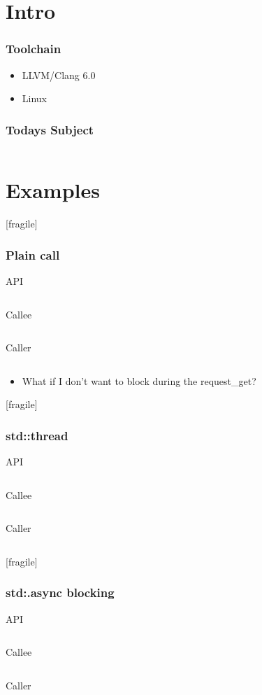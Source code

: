 
\section{Intro}


\begin{frame}[fragile]
	\frametitle{Toolchain}
	\begin{itemize}
		\item LLVM/Clang 6.0
		\item Linux
	\end{itemize}
\end{frame}

\newcommand{\code}[4]{\inputminted[fontsize=\scriptsize,firstline=#1,lastline=#2,xleftmargin=#3]{cpp}{../mixed/src/#4}}

\begin{frame}[fragile]
	\frametitle{Todays Subject}
	\code{12}{16}{10pt}{sync/http_client.h}
\end{frame}


\section{Examples}

\newcommand{\simpleexample}[7]{%
	API
	\code{#6}{#7}{0pt}{#5/http_client.h}
	\vspace{1mm}
	Callee
	\code{#1}{#2}{0pt}{presentation_examples_test.h}
	\vspace{1mm}
	Caller
	\code{#3}{#4}{-16pt}{presentation_examples_test.cpp}
}

\begin{frame}{[fragile]}
	\frametitle{Plain call}
	\simpleexample{22}{26}{15}{16}{sync}{12}{16}
	\begin{itemize}
		\item What if I don't want to block during the request\_get?
	\end{itemize}
\end{frame}%

\begin{frame}{[fragile]}
	\frametitle{std::thread}
	\simpleexample{30}{39}{22}{23}{threaded}{12}{16}
\end{frame}%

\begin{frame}{[fragile]}
	\frametitle{std:.async blocking}
	\simpleexample{41}{49}{29}{30}{threaded}{12}{16}
\end{frame}%

